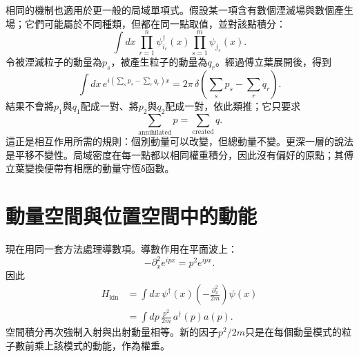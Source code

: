 \begin{classroomqa}
\end{classroomqa}

相同的機制也適用於更一般的局域單項式。假設某一項含有數個湮滅場與數個產生場；它們可能屬於不同種類，但都在同一點取值，並對該點積分：
\begin{equation}
\int dx\,
\prod_{r=1}^{n} \psi_{i_r}^\dagger(x)
\prod_{s=1}^{m} \psi_{j_s}(x).
\end{equation}
令被湮滅粒子的動量為\(p_s\)，被產生粒子的動量為\(q_r\)。經過傅立葉展開後，得到
\begin{equation}
\int dx\,
e^{i(\sum_s p_s-\sum_r q_r)x}
=2\pi\,
\delta\!\left(\sum_s p_s-\sum_r q_r\right).
\label{eq:l9-total-momentum-delta}
\end{equation}
結果不會將\(p_1\)與\(q_1\)配成一對、將\(p_2\)與\(q_2\)配成一對，依此類推；它只要求
\begin{equation}
\sum_{\mathrm{annihilated}}p
=
\sum_{\mathrm{created}}q.
\end{equation}
這正是相互作用所需的規則：個別動量可以改變，但總動量不變。更深一層的說法是平移不變性。局域密度在每一點都以相同權重積分，因此沒有偏好的原點；其傅立葉變換便帶有相應的動量守恆{\proseunicodefont δ}函數。

\begin{classroomqa}
\end{classroomqa}

\section{動量空間與位置空間中的動能}

現在用同一套方法處理導數項。導數作用在平面波上：
\begin{equation}
-\partial_x^2 e^{ipx}=p^2e^{ipx}.
\end{equation}
因此
\begin{align}
H_{\mathrm{kin}}
&=\int dx\,\psi^\dagger(x)
\left(-\frac{\partial_x^2}{2m}\right)\psi(x)\\
&=\int dp\,\frac{p^2}{2m}\,a^\dagger(p)a(p).
\label{eq:l9-kinetic-momentum}
\end{align}
空間積分再次強制入射與出射動量相等。新的因子\(p^2/2m\)只是在每個動量模式的粒子數前乘上該模式的動能，作為權重。

